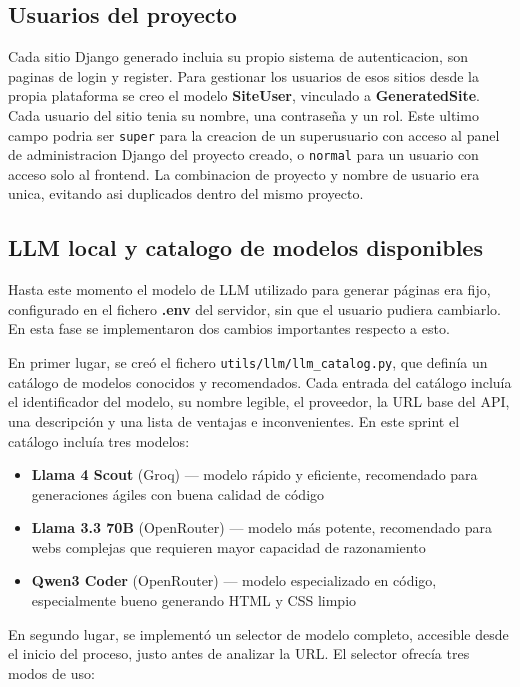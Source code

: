 \subsection{Usuarios del proyecto}
\label{subsec:usuarios-proyecto}

Cada sitio Django generado incluia su propio sistema de autenticacion, son paginas de login y register. Para gestionar los usuarios de esos sitios desde la propia plataforma se creo el modelo \textbf{SiteUser}, vinculado a \textbf{GeneratedSite}. Cada usuario del sitio tenia su nombre, una contraseña y un rol. Este ultimo campo podria ser \texttt{super} para la creacion de un superusuario con acceso al panel de administracion Django del proyecto creado, o \texttt{normal} para un usuario con acceso solo al frontend. La combinacion de proyecto y nombre de usuario era unica, evitando asi duplicados dentro del mismo proyecto.

\subsection{LLM local y catalogo de modelos disponibles}
\label{subsec:llm-local-catalogo-modelos}

Hasta este momento el modelo de LLM utilizado para generar páginas era fijo, configurado en el fichero \textbf{.env} del servidor, sin que el usuario pudiera cambiarlo. En esta fase se implementaron dos cambios importantes respecto a esto.

En primer lugar, se creó el fichero \texttt{utils/llm/llm\_catalog.py}, que definía un catálogo de modelos conocidos y recomendados. Cada entrada del catálogo incluía el identificador del modelo, su nombre legible, el proveedor, la URL base del API, una descripción y una lista de ventajas e inconvenientes. En este sprint el catálogo incluía tres modelos:

\begin{itemize}
    \item \textbf{Llama 4 Scout} (Groq) — modelo rápido y eficiente, recomendado para generaciones ágiles con buena calidad de código
    \item \textbf{Llama 3.3 70B} (OpenRouter) — modelo más potente, recomendado para webs complejas que requieren mayor capacidad de razonamiento
    \item \textbf{Qwen3 Coder} (OpenRouter) — modelo especializado en código, especialmente bueno generando HTML y CSS limpio
\end{itemize}


En segundo lugar, se implementó un selector de modelo completo, accesible desde el inicio del proceso, justo antes de analizar la URL. El selector ofrecía tres modos de uso:

